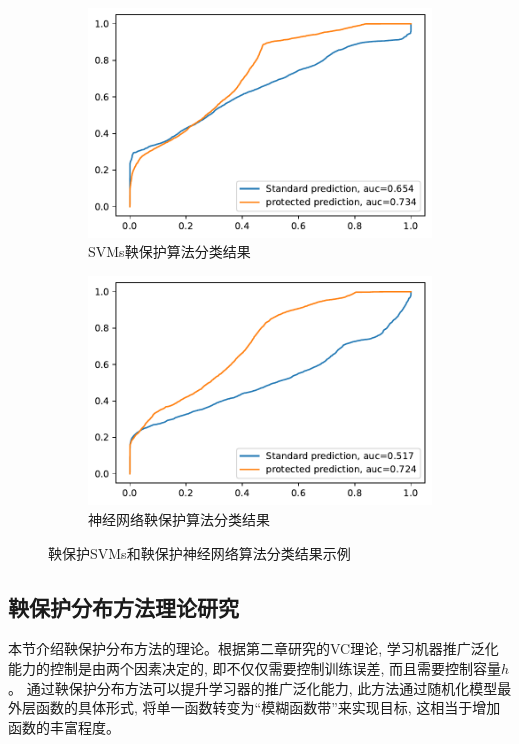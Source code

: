 \begin{figure}
     \centering
     \begin{subfigure}[b]{.45\textwidth}
         \centering
         \includegraphics[width=1\textwidth]{Img/chapter11/align-SVC}   
         \caption{SVMs鞅保护算法分类结果}
         \label{svm-1}
     \end{subfigure}
     \hfill
     \begin{subfigure}[b]{.45\textwidth}
         \centering
         \includegraphics[width=1\textwidth]{Img/chapter11/align-MLPClassifier}
         \caption{神经网络鞅保护算法分类结果}
         \label{nn-1}
     \end{subfigure}
\caption{鞅保护SVMs和鞅保护神经网络算法分类结果示例}
\label{fig:align-example}
\end{figure}

\subsection{鞅保护分布方法理论研究}
本节介绍鞅保护分布方法的理论。根据第二章研究的VC理论, 学习机器推广泛化能力的控制是由两个因素决定的, 即不仅仅需要控制训练误差, 而且需要控制容量$h$。 通过鞅保护分布方法可以提升学习器的推广泛化能力, 此方法通过随机化模型最外层函数的具体形式, 将单一函数转变为“模糊函数带”来实现目标, 这相当于增加函数的丰富程度。



